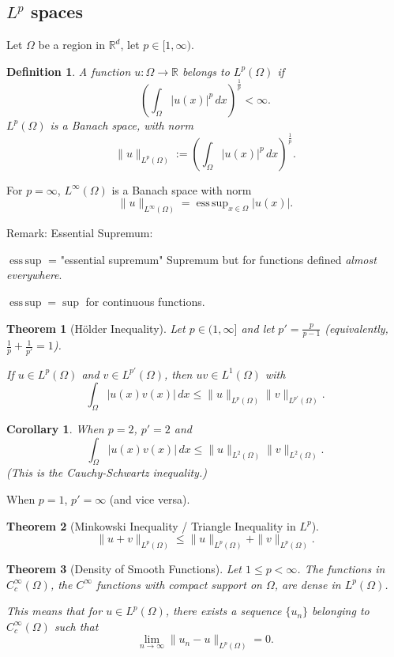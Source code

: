 \documentclass[12pt]{report}
\newtheorem{theorem}{Theorem}[section]
\newtheorem{corollary}{Corollary}[section]
\newtheorem{definition}{Definition}[section]
\begin{document}
\subsection{\(L^p\) spaces}
Let \(\Omega\) be a region in \(\mathbb{R}^d\), let \( p \in [1, \infty) \).
\begin{definition}
A function \( u: \Omega \to \mathbb{R} \) belongs to \( L^p(\Omega) \) if
\[
\left( \int_{\Omega} |u(x)|^p \, dx \right)^{\frac{1}{p}} < \infty.
\]
\( L^p(\Omega) \) is a Banach space, with norm
\[
\|u\|_{L^p(\Omega)} := \left( \int_{\Omega} |u(x)|^p \, dx \right)^{\frac{1}{p}}.
\]
\end{definition}
For \( p = \infty \), \( L^\infty(\Omega) \) is a Banach space with norm
\[
\|u\|_{L^\infty(\Omega)} = \operatorname{ess\,sup}_{x \in \Omega} |u(x)|.
\]

Remark: Essential Supremum:

\(\operatorname{ess\,sup}\) = "essential supremum"  
Supremum but for functions defined \emph{almost everywhere}.  

\(\operatorname{ess\,sup} = \sup\) for continuous functions.
\begin{theorem}[Hölder Inequality]
Let \( p \in (1, \infty] \) and let \( p' = \frac{p}{p-1} \) (equivalently, \( \frac{1}{p} + \frac{1}{p'} = 1 \)).

If \( u \in L^p(\Omega) \) and \( v \in L^{p'}(\Omega) \), then \( uv \in L^1(\Omega) \) with
\[
\int_{\Omega} |u(x) v(x)| \, dx \leq \|u\|_{L^p(\Omega)} \|v\|_{L^{p'}(\Omega)}.
\]
\end{theorem}
\begin{corollary}
When \( p = 2 \), \( p' = 2 \) and
\[
\int_{\Omega} |u(x) v(x)| \, dx \leq \|u\|_{L^2(\Omega)} \|v\|_{L^2(\Omega)}.
\]
(This is the \textit{Cauchy-Schwartz inequality}.)
\end{corollary}
When \( p = 1 \), \( p' = \infty \) (and vice versa).
\begin{theorem}[Minkowski Inequality / Triangle Inequality in \( L^p \)]
\[
\|u + v\|_{L^p(\Omega)} \leq \|u\|_{L^p(\Omega)} + \|v\|_{L^p(\Omega)}.
\]
\end{theorem}
\begin{theorem}[Density of Smooth Functions]
Let \( 1 \leq p < \infty \). The functions in \( C_c^\infty(\Omega) \), the \( C^\infty \) functions with compact support on \( \Omega \), are \textit{dense} in \( L^p(\Omega) \).  

This means that for \( u \in L^p(\Omega) \), there exists a sequence \( \{ u_n \} \) belonging to \( C_c^\infty(\Omega) \) such that
\[
\lim_{n \to \infty} \| u_n - u \|_{L^p(\Omega)} = 0.
\]
\end{theorem}
\end{document}
